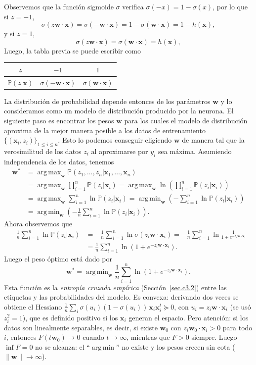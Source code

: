 \documentclass[12pt, a4paper]{amsbook}
\def\argmin{\operatorname {\mathrm{arg\, min}}}
\def\argmax{\operatorname {\mathrm{arg\, max}}}
\renewcommand{\P}{{\mathbb P}}
\newcommand{\ww}{{\mathbf w}}
\newcommand{\xx}{{\mathbf x}}
\theoremstyle{remark}
\theoremstyle{definition}
\numberwithin{section}{chapter}
\numberwithin{subsection}{section}
\numberwithin{equation}{section}
\numberwithin{figure}{chapter}
\begin{document}
Observemos que la función sigmoide $\sigma$ verifica $\sigma(-x) = 1-\sigma(x)$, por lo que si $z=-1$,
$$
\sigma(z\ww\cdot\xx) = \sigma(-\ww\cdot\xx) = 1-\sigma(\ww\cdot\xx) = 1-h(\xx),
$$
y si $z=1$,
$$
\sigma(z\ww\cdot\xx) = \sigma(\ww\cdot\xx) = h(\xx),
$$
Luego, la tabla previa se puede escribir como
\begin{center}
\begin{tabular}{|c|c|c|}
\hline
$z$ & $-1$ & $1$\\ \hline
$\P(z|\xx)$ & $\sigma(-\ww\cdot\xx)$ & $\sigma(\ww\cdot\xx)$ \\ \hline
\end{tabular}
\end{center}
La distribución de probabilidad depende entonces de los parámetros $\ww$ y lo consideramos como un modelo de distribución producido por la neurona. El siguiente paso es encontrar los pesos $\ww$ para los cuales el modelo de distribución aproxima de la mejor manera posible a los datos de entrenamiento $\{(\xx_i, z_i)\}_{1\le i\le n}$. Esto lo podemos conseguir eligiendo $\ww$ de manera tal que la verosimilitud de los datos $z_i$ al aproximarse por $y_i$ sea máxima. Asumiendo independencia de los datos, tenemos
\begin{align*}
\ww^* &= \argmax_{\ww} \P(z_1,\dots,z_n | \xx_1,\dots,\xx_n) \\
&= \argmax_{\ww} \prod_{i=1}^n \P(z_i|\xx_i) = \argmax_{\ww} \ln\left(\prod_{i=1}^n \P(z_i|\xx_i)\right)\\
&=\argmax_{\ww} \sum_{i=1}^n \ln \P(z_i|\xx_i) = \argmin_{\ww} \left(-\sum_{i=1}^n \ln \P(z_i|\xx_i)\right)\\
&= \argmin_{\ww} \left(-\frac{1}{n}\sum_{i=1}^n \ln \P(z_i|\xx_i)\right).
\end{align*}
Ahora observemos que
\begin{align*}
-\frac{1}{n}\sum_{i=1}^n \ln \P(z_i|\xx_i) &= -\frac{1}{n}\sum_{i=1}^n \ln \sigma(z_i \ww\cdot \xx_i) = -\frac{1}{n}\sum_{i=1}^n \ln \frac{1}{1+e^{-z_i\ww\cdot\xx_i}}\\
&=\frac{1}{n}\sum_{i=1}^n \ln(1+e^{-z_i\ww\cdot\xx_i}).
\end{align*}
Luego el peso óptimo está dado por
$$
\ww^* = \argmin_\ww \frac{1}{n}\sum_{i=1}^n \ln(1+e^{-z_i\ww\cdot\xx_i}).
$$
Esta función es la {\em entropía cruzada empírica} (Sección~\ref{sec.c3.2}) entre las etiquetas y las probabilidades del modelo. Es convexa: derivando dos veces se obtiene el Hessiano $\frac1n\sum_{i}\sigma(u_i)(1-\sigma(u_i))\,\xx_i\xx_i^t\succeq0$, con $u_i=z_i\ww\cdot\xx_i$ (se usó $z_i^2=1$), que es definido positivo si los $\xx_i$ generan el espacio. Pero atención: si los datos son linealmente separables, es decir, si existe $\ww_0$ con $z_i\ww_0\cdot\xx_i>0$ para todo $i$, entonces $F(t\ww_0)\to0$ cuando $t\to\infty$, mientras que $F>0$ siempre. Luego $\inf F=0$ no se alcanza: el ``$\argmin$'' no existe y los pesos crecen sin cota ($\|\ww\|\to\infty$).
\end{document}
